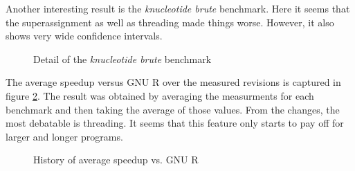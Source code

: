 Another interesting result is the \emph{knucleotide brute} benchmark. Here it seems that the superassignment as well as threading made things worse. However, it also shows very wide confidence intervals.

\begin{figure}[htbp]
  \caption{\label{fig:knucleotide}Detail of the \emph{knucleotide brute} benchmark}
  \centering
\end{figure}

The average speedup versus GNU R over the measured revisions is captured in figure \ref{fig:avg-speedup-history}. The result was obtained by averaging the measurments for each benchmark and then taking the average of those values. From the changes, the most debatable is threading. It seems that this feature only starts to pay off for larger and longer programs.

\begin{figure}[htbp]
  \caption{\label{fig:avg-speedup-history}History of average speedup vs. GNU R}
  \centering
\end{figure}
